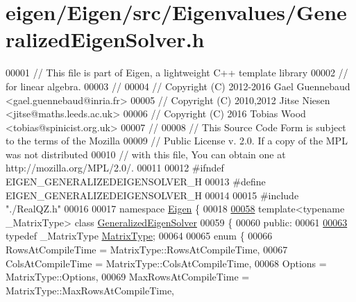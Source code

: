 \hypertarget{eigen_2_eigen_2src_2_eigenvalues_2_generalized_eigen_solver_8h_source}{}\section{eigen/\+Eigen/src/\+Eigenvalues/\+Generalized\+Eigen\+Solver.h}
\label{eigen_2_eigen_2src_2_eigenvalues_2_generalized_eigen_solver_8h_source}

\begin{DoxyCode}
00001 \textcolor{comment}{// This file is part of Eigen, a lightweight C++ template library}
00002 \textcolor{comment}{// for linear algebra.}
00003 \textcolor{comment}{//}
00004 \textcolor{comment}{// Copyright (C) 2012-2016 Gael Guennebaud <gael.guennebaud@inria.fr>}
00005 \textcolor{comment}{// Copyright (C) 2010,2012 Jitse Niesen <jitse@maths.leeds.ac.uk>}
00006 \textcolor{comment}{// Copyright (C) 2016 Tobias Wood <tobias@spinicist.org.uk>}
00007 \textcolor{comment}{//}
00008 \textcolor{comment}{// This Source Code Form is subject to the terms of the Mozilla}
00009 \textcolor{comment}{// Public License v. 2.0. If a copy of the MPL was not distributed}
00010 \textcolor{comment}{// with this file, You can obtain one at http://mozilla.org/MPL/2.0/.}
00011 
00012 \textcolor{preprocessor}{#ifndef EIGEN\_GENERALIZEDEIGENSOLVER\_H}
00013 \textcolor{preprocessor}{#define EIGEN\_GENERALIZEDEIGENSOLVER\_H}
00014 
00015 \textcolor{preprocessor}{#include "./RealQZ.h"}
00016 
00017 \textcolor{keyword}{namespace }\hyperlink{namespace_eigen}{Eigen} \{ 
00018 
\hyperlink{group___eigenvalues___module}{00058} \textcolor{keyword}{template}<\textcolor{keyword}{typename} \_MatrixType> \textcolor{keyword}{class }\hyperlink{group___eigenvalues___module_class_eigen_1_1_generalized_eigen_solver}{GeneralizedEigenSolver}
00059 \{
00060   \textcolor{keyword}{public}:
00061 
\hyperlink{group___eigenvalues___module_a56f4b9823bb9a267de3aaf48428cd247}{00063}     \textcolor{keyword}{typedef} \_MatrixType \hyperlink{group___eigenvalues___module_a56f4b9823bb9a267de3aaf48428cd247}{MatrixType};
00064 
00065     \textcolor{keyword}{enum} \{
00066       RowsAtCompileTime = MatrixType::RowsAtCompileTime,
00067       ColsAtCompileTime = MatrixType::ColsAtCompileTime,
00068       Options = MatrixType::Options,
00069       MaxRowsAtCompileTime = MatrixType::MaxRowsAtCompileTime,

\end{DoxyCode}
